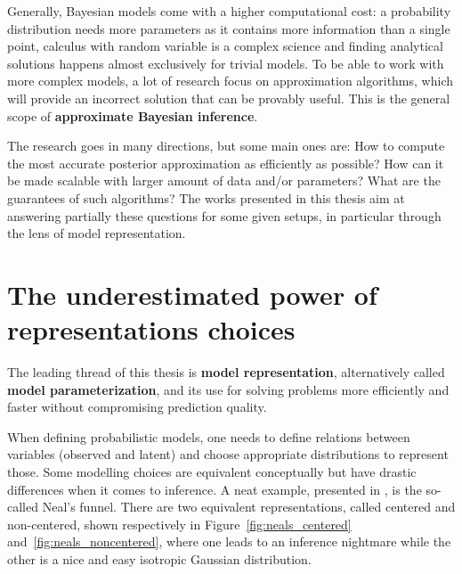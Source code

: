 Generally, Bayesian models come with a higher computational cost: a probability distribution needs more parameters as it contains more information than a single point, calculus with random variable is a complex science and finding analytical solutions happens almost exclusively for trivial models.
To be able to work with more complex models, a lot of research focus on approximation algorithms, which will provide an incorrect solution that can be provably useful.
This is the general scope of \textbf{approximate Bayesian inference}.

The research goes in many directions, but some main ones are: How to compute the most accurate posterior approximation as efficiently as possible? How can it be made scalable with larger amount of data and/or parameters? What are the guarantees of such algorithms?
The works presented in this thesis aim at answering partially these questions for some given setups, in particular through the lens of model representation.

\section{The underestimated power of representations choices}

The leading thread of this thesis is \textbf{model representation}, alternatively called \textbf{model parameterization}, and its use for solving problems more efficiently and faster without compromising prediction quality.

When defining probabilistic models, one needs to define relations between variables (observed and latent) and choose appropriate distributions to represent those.
Some modelling choices are equivalent conceptually but have drastic differences when it comes to inference.
A neat example, presented in \citet{gorinovaAutomaticReparameterisationProbabilistic2020}, is the so-called Neal's funnel.
There are two equivalent representations, called centered and non-centered, shown respectively in Figure~\ref{fig:neals_centered} and~\ref{fig:neals_noncentered}, where one leads to an inference nightmare while the other is a nice and easy isotropic Gaussian distribution.

